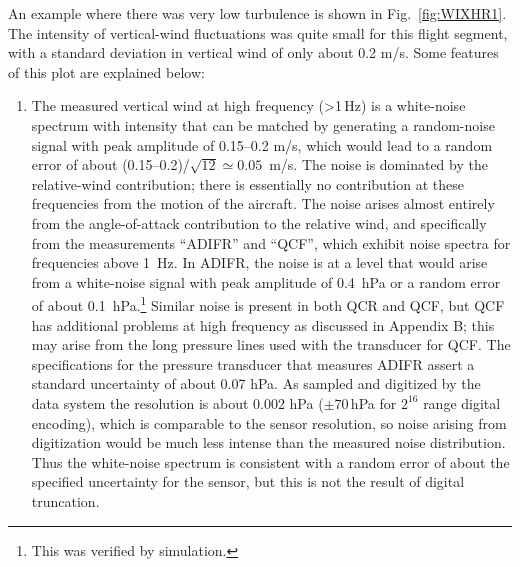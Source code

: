 \documentclass[12pt,twoside,english]{article}\usepackage[]{graphicx}\usepackage[]{color}
\let\OrgIndex\index
\renewcommand*{\index}[1]{\OrgIndex{#1}}
\begin{document}
An example where there was very low turbulence is shown in Fig.~\ref{fig:WIXHR1}. The intensity of vertical-wind fluctuations was quite small for this flight segment, with a standard deviation in vertical wind of only about 0.2 m/s. Some features of this plot are explained below:  
\begin{enumerate}
\item The measured vertical wind at high frequency (>1\,Hz) is a white-noise spectrum with intensity that can be matched by generating a random-noise signal with peak amplitude of 0.15--0.2 m/s, which would lead to a random error of about (0.15--0.2)/$\sqrt{12}\simeq0.05$~m/s. The noise is dominated by the relative-wind contribution; there is essentially no contribution at these frequencies from the motion of the aircraft. The noise arises almost entirely from the angle-of-attack contribution to the relative wind, and specifically from the measurements ``ADIFR'' and ``QCF'', which exhibit noise spectra for frequencies above 1~Hz. In ADIFR, the noise is at a level that would arise from a white-noise signal with peak amplitude of 0.4~hPa or a random error of about 0.1~hPa.\footnote{This was verified by simulation.} \label{page:ADIFRnoise}Similar noise is present in both QCR and QCF, but QCF has additional problems at high frequency as discussed in Appendix B; this may arise from the long pressure lines used with the transducer for QCF. The specifications for the pressure transducer that measures ADIFR assert a standard uncertainty of about 0.07 hPa. As sampled and digitized by the data system the resolution is about 0.002 hPa ($\pm70\,$hPa for $2^{16}$ range digital encoding), which is comparable to the sensor resolution, so noise arising from digitization would be much less intense than the measured noise distribution. Thus the white-noise spectrum is consistent with a random error of about the specified uncertainty for the sensor, but this is not the result of digital truncation. 


\end{enumerate}
\end{document}

